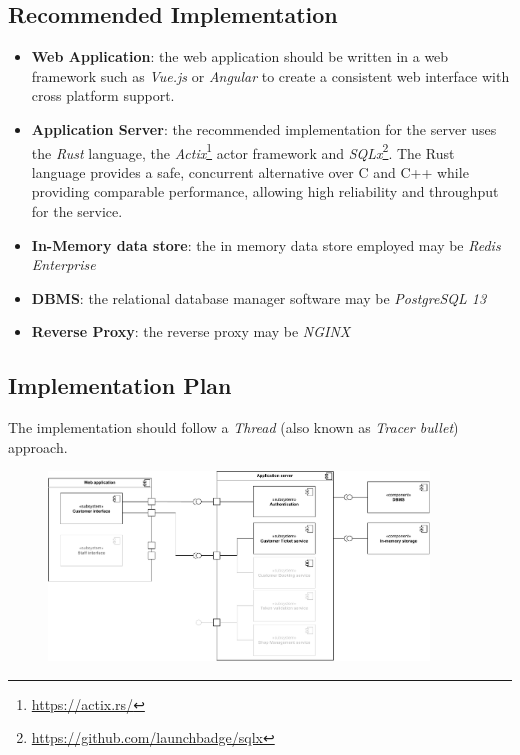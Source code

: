 
\subsection{Recommended Implementation}
\begin{itemize}
    \item \textbf{Web Application}: the web application should be written in a web framework such as \emph{Vue.js} or \emph{Angular} to create a consistent web interface with cross platform support.
    \item \textbf{Application Server}: the recommended implementation for the server uses the \emph{Rust} language, the \emph{Actix}\footnote{\href{https://actix.rs/}{https://actix.rs/}} actor framework and \emph{SQLx}\footnote{\href{https://github.com/launchbadge/sqlx}{https://github.com/launchbadge/sqlx}}. The Rust language provides a safe, concurrent alternative over C and C++ while providing comparable performance, allowing high reliability and throughput for the service.
    \item \textbf{In-Memory data store}: the in memory data store employed may be \emph{Redis Enterprise}
    \item \textbf{DBMS}: the relational database manager software may be \emph{PostgreSQL 13}
    \item \textbf{Reverse Proxy}: the reverse proxy may be \emph{NGINX}
\end{itemize}

\subsection{Implementation Plan}

The implementation should follow a \emph{Thread} (also known as \emph{Tracer bullet}\cite{pragmatic}) approach. 

\begin{figure}[H]
    \centering
    \includegraphics[width=0.9\textwidth]{Images/component2_tb.pdf}
\end{figure}

